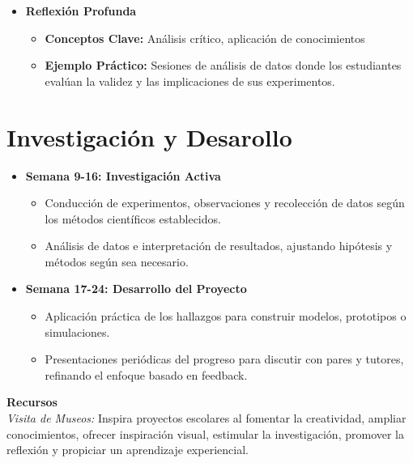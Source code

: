 \begin{itemize}[label={}]
    \item \textbf{Reflexión Profunda}
    \begin{itemize}
        \item \textbf{Conceptos Clave:} Análisis crítico, aplicación de conocimientos
        \item \textbf{Ejemplo Práctico:} Sesiones de análisis de datos donde los estudiantes evalúan la validez y las implicaciones de sus experimentos.
    \end{itemize}
\end{itemize}


\newpage
\section{Investigación y Desarollo}
\begin{itemize}
  \item \textbf{Semana 9-16: Investigación Activa}
  \begin{itemize}
    \item Conducción de experimentos, observaciones y recolección de datos según los métodos científicos establecidos.
    \item Análisis de datos e interpretación de resultados, ajustando hipótesis y métodos según sea necesario.
  \end{itemize}
  \item \textbf{Semana 17-24: Desarrollo del Proyecto}
  \begin{itemize}
    \item Aplicación práctica de los hallazgos para construir modelos, prototipos o simulaciones.
    \item Presentaciones periódicas del progreso para discutir con pares y tutores, refinando el enfoque basado en feedback.
  \end{itemize}
\end{itemize}
{\large \textbf{Recursos}}\\
\textit{Visita de Museos:}  Inspira proyectos escolares al fomentar la creatividad, ampliar conocimientos, ofrecer inspiración visual, estimular la investigación, promover la reflexión y propiciar un aprendizaje experiencial.

